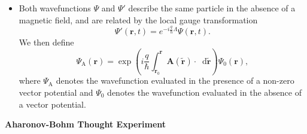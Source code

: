 \documentclass[11pt, a4paper]{article}
\newcommand{\diff}{\mathop{}\!\mathrm{d}} %
\renewcommand{\vec}[1]{\bm{#1}}  %
\renewcommand{\t}[1]{\tilde{#1}}
\renewcommand{\r}{\vec{r}}  %
\newcommand{\A}{\vec{A}}  %
\renewcommand{\P}{\Psi}  %
\begin{document}
\begin{itemize}
	\item Both wavefunctions $ \P $ and $ \P' $ describe the same particle in the absence of a magnetic field, and are related by the local gauge transformation
	\begin{equation*}
		\P'(\r, t) = e^{- i\frac{q}{\hbar} \Lambda} \P(\r, t).
	\end{equation*}
	We then define
	\begin{equation*}
		\P_{\text{A}}(\r) = \exp\left(i\frac{q}{\hbar} \int_{\r_{0}}^{\r}\A(\t{\r})\cdot \diff\t{\r}\right) \P_{0}(\r),
	\end{equation*}
	where $ \P_{\text{A}} $ denotes the wavefunction evaluated in the presence of a non-zero vector potential and $ \P_{0} $ denotes the wavefunction evaluated in the absence of a vector potential.
\end{itemize}
\textbf{Aharonov-Bohm Thought Experiment}
\end{document}
